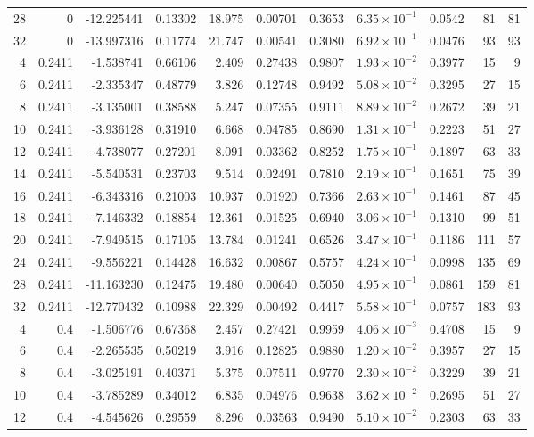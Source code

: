 \documentclass[11pt]{article}
\begin{document}
{\begin{longtable}{rrrrrrrrrrr}
28 & 0 & -12.225441 & 0.13302 & 18.975 & 0.00701 & 0.3653 & $6.35\times10^{-1}$ & 0.0542 & 81 & 81 \\
32 & 0 & -13.997316 & 0.11774 & 21.747 & 0.00541 & 0.3080 & $6.92\times10^{-1}$ & 0.0476 & 93 & 93 \\
4 & 0.2411 & -1.538741 & 0.66106 & 2.409 & 0.27438 & 0.9807 & $1.93\times10^{-2}$ & 0.3977 & 15 & 9 \\
6 & 0.2411 & -2.335347 & 0.48779 & 3.826 & 0.12748 & 0.9492 & $5.08\times10^{-2}$ & 0.3295 & 27 & 15 \\
8 & 0.2411 & -3.135001 & 0.38588 & 5.247 & 0.07355 & 0.9111 & $8.89\times10^{-2}$ & 0.2672 & 39 & 21 \\
10 & 0.2411 & -3.936128 & 0.31910 & 6.668 & 0.04785 & 0.8690 & $1.31\times10^{-1}$ & 0.2223 & 51 & 27 \\
12 & 0.2411 & -4.738077 & 0.27201 & 8.091 & 0.03362 & 0.8252 & $1.75\times10^{-1}$ & 0.1897 & 63 & 33 \\
14 & 0.2411 & -5.540531 & 0.23703 & 9.514 & 0.02491 & 0.7810 & $2.19\times10^{-1}$ & 0.1651 & 75 & 39 \\
16 & 0.2411 & -6.343316 & 0.21003 & 10.937 & 0.01920 & 0.7366 & $2.63\times10^{-1}$ & 0.1461 & 87 & 45 \\
18 & 0.2411 & -7.146332 & 0.18854 & 12.361 & 0.01525 & 0.6940 & $3.06\times10^{-1}$ & 0.1310 & 99 & 51 \\
20 & 0.2411 & -7.949515 & 0.17105 & 13.784 & 0.01241 & 0.6526 & $3.47\times10^{-1}$ & 0.1186 & 111 & 57 \\
24 & 0.2411 & -9.556221 & 0.14428 & 16.632 & 0.00867 & 0.5757 & $4.24\times10^{-1}$ & 0.0998 & 135 & 69 \\
28 & 0.2411 & -11.163230 & 0.12475 & 19.480 & 0.00640 & 0.5050 & $4.95\times10^{-1}$ & 0.0861 & 159 & 81 \\
32 & 0.2411 & -12.770432 & 0.10988 & 22.329 & 0.00492 & 0.4417 & $5.58\times10^{-1}$ & 0.0757 & 183 & 93 \\
4 & 0.4 & -1.506776 & 0.67368 & 2.457 & 0.27421 & 0.9959 & $4.06\times10^{-3}$ & 0.4708 & 15 & 9 \\
6 & 0.4 & -2.265535 & 0.50219 & 3.916 & 0.12825 & 0.9880 & $1.20\times10^{-2}$ & 0.3957 & 27 & 15 \\
8 & 0.4 & -3.025191 & 0.40371 & 5.375 & 0.07511 & 0.9770 & $2.30\times10^{-2}$ & 0.3229 & 39 & 21 \\
10 & 0.4 & -3.785289 & 0.34012 & 6.835 & 0.04976 & 0.9638 & $3.62\times10^{-2}$ & 0.2695 & 51 & 27 \\
12 & 0.4 & -4.545626 & 0.29559 & 8.296 & 0.03563 & 0.9490 & $5.10\times10^{-2}$ & 0.2303 & 63 & 33 \\

\end{longtable}}
\end{document}
